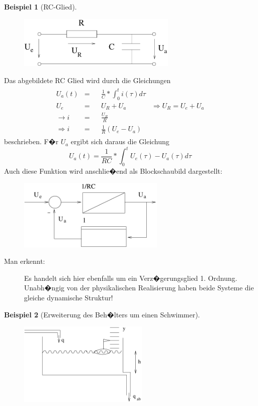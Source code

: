 \documentclass[12pt,a4paper,ngerman]{scrartcl}
\newtheorem{bsp}{Beispiel}[section] %
\begin{document}
\begin{bsp}[RC-Glied]
\end{bsp}
\begin{figure}[H]
\includegraphics[height=2.5cm]{sysregel_RC}
\end{figure}
Das abgebildete RC Glied wird durch die Gleichungen
\begin{align*}
  \begin{array}{lrlll}
  U_a(t)&=&&\frac{1}{C}*\int_0^t{i(\tau)d\tau}\\
  U_e&=&&U_R+U_a &\Rightarrow U_R=U_e+U_a\\
  \rightarrow i&=&&\frac{U_R}{R}\\
  \Rightarrow i&=&&\frac{1}{R}(U_e-U_a)
 \end{array}
\end{align*}
beschrieben. F�r $U_a$ ergibt sich daraus die Gleichung
\begin{equation*}
  U_a(t)=\frac{1}{RC}*\int_0^t{U_e(\tau)-U_a(\tau)d\tau}
\end{equation*}
Auch diese Funktion wird anschlie�end als Blockschaubild dargestellt:
\begin{figure}[H]
\includegraphics[width=7cm]{sysregel_bsb3}\\
\end{figure}
\begin{description}
\item[Man erkennt:] Es handelt sich hier ebenfalls um ein Verz�gerungsglied 1. Ordnung. Unabh�ngig von der physikalischen Realisierung haben beide Systeme die gleiche dynamische Struktur!
\end{description}
\begin{bsp}[Erweiterung des Beh�lters um einen Schwimmer]
\end{bsp}
\begin{minipage}{.4\linewidth}
\begin{figure}[H]
  \includegraphics[height=4cm]{sysregel_bsp_4}
\end{figure}
\end{minipage}
\end{document}
